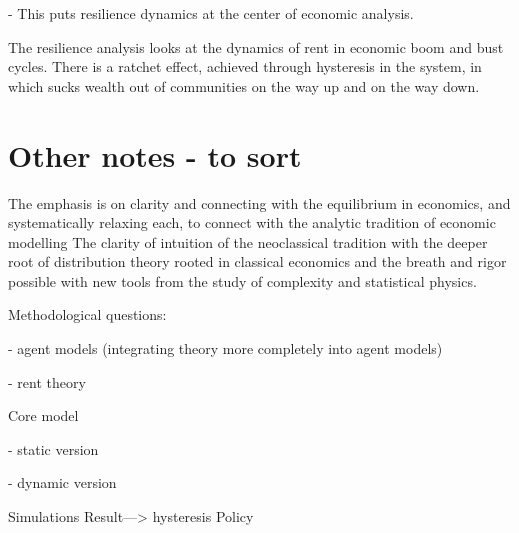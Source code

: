 - This puts resilience dynamics at the center of economic analysis.

The resilience analysis looks at the dynamics of rent in economic boom and bust cycles.
There is a ratchet effect, achieved through hysteresis in the system, in which sucks wealth out of communities on the way up and on the way down. %


\section{Other notes - to sort}


The emphasis is on clarity and connecting with the equilibrium in economics, and systematically relaxing each, to connect with the analytic tradition of economic modelling
The clarity of intuition of the neoclassical tradition with the deeper root of distribution theory rooted in classical economics and the breath and rigor possible with new tools from the study of complexity and statistical physics.

Methodological questions: 

    - agent models (integrating theory more completely into agent models)
    
    - rent theory

Core model

    - static version
    
    - dynamic version

Simulations
Result---> hysteresis
Policy